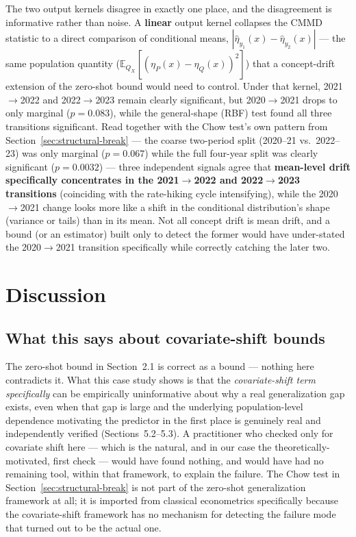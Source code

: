\documentclass[11pt]{article}
\begin{document}
The two output kernels disagree in exactly one place, and the disagreement is informative rather than noise. A \textbf{linear} output kernel collapses the CMMD statistic to a direct comparison of conditional means, $|\hat\eta_{y_1}(x)-\hat\eta_{y_2}(x)|$ --- the same population quantity ($\mathbb{E}_{Q_X}[(\eta_P(x)-\eta_Q(x))^2]$) that a concept-drift extension of the zero-shot bound would need to control. Under that kernel, 2021$\to$2022 and 2022$\to$2023 remain clearly significant, but 2020$\to$2021 drops to only marginal ($p=0.083$), while the general-shape (RBF) test found all three transitions significant. Read together with the Chow test's own pattern from Section~\ref{sec:structural-break} --- the coarse two-period split (2020--21 vs.\ 2022--23) was only marginal ($p=0.067$) while the full four-year split was clearly significant ($p=0.0032$) --- three independent signals agree that \textbf{mean-level drift specifically concentrates in the 2021$\to$2022 and 2022$\to$2023 transitions} (coinciding with the rate-hiking cycle intensifying), while the 2020$\to$2021 change looks more like a shift in the conditional distribution's shape (variance or tails) than in its mean. Not all concept drift is mean drift, and a bound (or an estimator) built only to detect the former would have under-stated the 2020$\to$2021 transition specifically while correctly catching the later two.

\section{Discussion}
\label{sec:discussion}

\subsection{What this says about covariate-shift bounds}

The zero-shot bound in Section~2.1 is correct as a bound --- nothing here contradicts it. What this case study shows is that the \emph{covariate-shift term specifically} can be empirically uninformative about why a real generalization gap exists, even when that gap is large and the underlying population-level dependence motivating the predictor in the first place is genuinely real and independently verified (Sections~5.2--5.3). A practitioner who checked only for covariate shift here --- which is the natural, and in our case the theoretically-motivated, first check --- would have found nothing, and would have had no remaining tool, within that framework, to explain the failure. The Chow test in Section~\ref{sec:structural-break} is not part of the zero-shot generalization framework at all; it is imported from classical econometrics specifically because the covariate-shift framework has no mechanism for detecting the failure mode that turned out to be the actual one.
\end{document}
